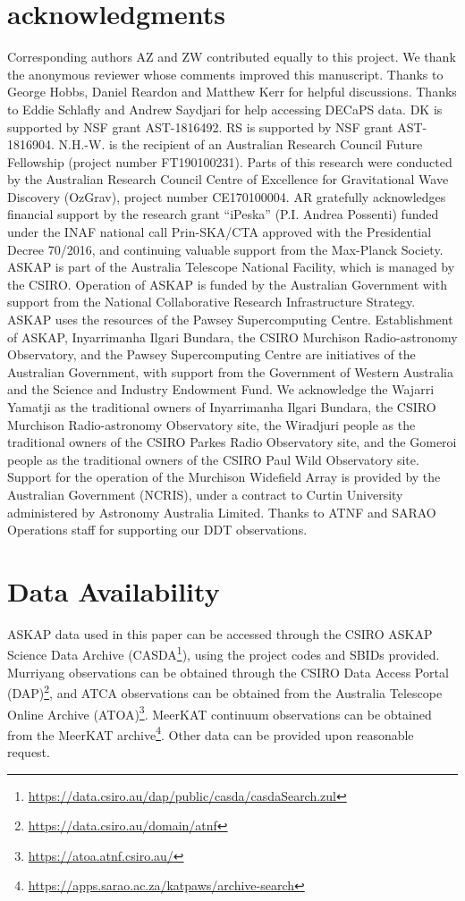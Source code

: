\documentclass[fleqn,usenatbib]{mnras}
\begin{document}
\section*{acknowledgments}
Corresponding authors AZ and ZW contributed equally to this project. We thank the anonymous reviewer whose comments improved this manuscript.
Thanks to George Hobbs, Daniel Reardon and Matthew Kerr for helpful discussions. Thanks to Eddie Schlafly and Andrew Saydjari for help accessing DECaPS data.
DK is supported by NSF grant AST-1816492. RS is supported by NSF grant AST-1816904. N.H.-W. is the recipient of an Australian Research Council Future Fellowship (project number FT190100231).
Parts of this research were conducted by the Australian Research Council Centre of Excellence for Gravitational Wave Discovery (OzGrav), project number CE170100004.
AR gratefully acknowledges financial support by the research grant ``iPeska'' (P.I. Andrea Possenti) funded under the INAF national call Prin-SKA/CTA approved with the Presidential Decree 70/2016, and continuing valuable support from the Max-Planck Society.
ASKAP is part of the Australia Telescope National Facility,
which is managed by the CSIRO. Operation of ASKAP is
funded by the Australian Government with support from the
National Collaborative Research Infrastructure Strategy. ASKAP
uses the resources of the Pawsey Supercomputing Centre.
Establishment of ASKAP, Inyarrimanha Ilgari Bundara, the CSIRO Murchison Radio-astronomy
Observatory, and the Pawsey Supercomputing Centre are
initiatives of the Australian Government, with support from
the Government of Western Australia and the Science and
Industry Endowment Fund. We acknowledge the Wajarri
Yamatji as the traditional owners of Inyarrimanha Ilgari Bundara, the CSIRO Murchison Radio-astronomy
Observatory site, the Wiradjuri people as the traditional owners of the CSIRO Parkes Radio Observatory site, and the Gomeroi people as the traditional owners of the CSIRO Paul Wild Observatory site. Support for the operation of the Murchison Widefield Array is provided by the Australian Government (NCRIS), under a contract to Curtin University administered by Astronomy Australia Limited. Thanks to ATNF and SARAO Operations staff for supporting our DDT observations. 

\section*{Data Availability}
ASKAP data used in this paper can be accessed through the CSIRO ASKAP Science Data Archive (CASDA\footnote{\url{https://data.csiro.au/dap/public/casda/casdaSearch.zul}}), using the project codes and SBIDs provided.
Murriyang observations can be obtained through the CSIRO Data Access Portal (DAP)\footnote{\url{https://data.csiro.au/domain/atnf}}, and ATCA observations can be obtained from the Australia Telescope Online Archive (ATOA)\footnote{\url{https://atoa.atnf.csiro.au/}}.
MeerKAT continuum observations can be obtained from the MeerKAT archive\footnote{\url{https://apps.sarao.ac.za/katpaws/archive-search}}. Other data can be provided upon reasonable request.
\end{document}
